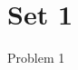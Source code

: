 \documentclass[11pt, a5paper]{article}
\begin{document}
\section*{Set 1}

\begin{problem}
Problem 1
\end{problem}
\end{document}

